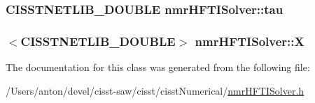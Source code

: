 \subsubsection[{tau}]{\setlength{\rightskip}{0pt plus 5cm}C\+I\+S\+S\+T\+N\+E\+T\+L\+I\+B\+\_\+\+D\+O\+U\+B\+L\+E nmr\+H\+F\+T\+I\+Solver\+::tau\hspace{0.3cm}{\ttfamily [protected]}}\label{classnmr_h_f_t_i_solver_ae2a7e0bc2500e3f05e2028b37b7666bc}
\hypertarget{classnmr_h_f_t_i_solver_a4e62d4f46bf8c16e79aef9063ce9a901}{}
\subsubsection[{X}]{$<$C\+I\+S\+S\+T\+N\+E\+T\+L\+I\+B\+\_\+\+D\+O\+U\+B\+L\+E$>$ nmr\+H\+F\+T\+I\+Solver\+::\+X\hspace{0.3cm}{\ttfamily [protected]}}\label{classnmr_h_f_t_i_solver_a4e62d4f46bf8c16e79aef9063ce9a901}


The documentation for this class was generated from the following file\+:\begin{DoxyCompactItemize}
\item 
/\+Users/anton/devel/cisst-\/saw/cisst/cisst\+Numerical/\hyperlink{nmr_h_f_t_i_solver_8h}{nmr\+H\+F\+T\+I\+Solver.\+h}\end{DoxyCompactItemize}
